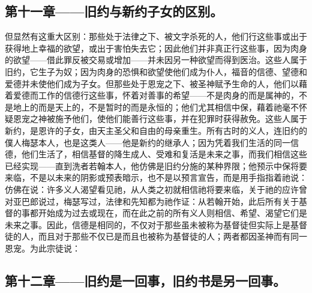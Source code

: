 
\subsection{第十一章——旧约与新约子女的区别。}

但显然有这重大区别：那些处于法律之下、被文字杀死的人，他们行这些事或出于获得地上幸福的欲望，或出于害怕失去它；因此他们并非真正行这些事，因为肉身的欲望——借此罪反被交易或增加——并未因另一种欲望而得到医治。这些人属于旧约，它生子为奴；因为肉身的恐惧和欲望使他们成为仆人，福音的信德、望德和爱德并未使他们成为子女。但那些处于恩宠之下、被圣神赋予生命的人，他们以藉着爱德而工作的信德行这些事，怀着对善事的希望——不是肉身的而是属神的，不是地上的而是天上的，不是暂时的而是永恒的；他们尤其相信中保，藉着祂毫不怀疑恩宠之神被施予他们，使他们能善行这些事，并在犯罪时获得赦免。这些人属于新约，是恩许的子女，由天主圣父和自由的母亲重生。所有古时的义人，连旧约的僕人梅瑟本人，也是这类人——他是新约的继承人；因为凭着我们生活的同一信德，他们生活了，相信基督的降生成人、受难和复活是未来之事，而我们相信这些已经实现——直到洗者若翰本人，他仿佛是旧约分施的某种界限；他预示中保将要来临，不是以未来的阴影或预表暗示，也不是以预言宣告，而是用手指指着祂说：仿佛在说：许多义人渴望看见祂，从人类之初就相信祂将要来临，关于祂的应许曾对亚巴郎说过，梅瑟写过，法律和先知都为祂作证：从若翰开始，此后所有关于基督的事都开始成为过去或现在，而在此之前的所有义人则相信、希望、渴望它们是未来之事。因此，信德是相同的，不仅对于那些虽未被称为基督徒但实际上是基督徒的人，而且对于那些不仅已是而且也被称为基督徒的人；两者都因圣神而有同一恩宠。为此宗徒说：\par


\subsection{第十二章——旧约是一回事，旧约书是另一回事。}

